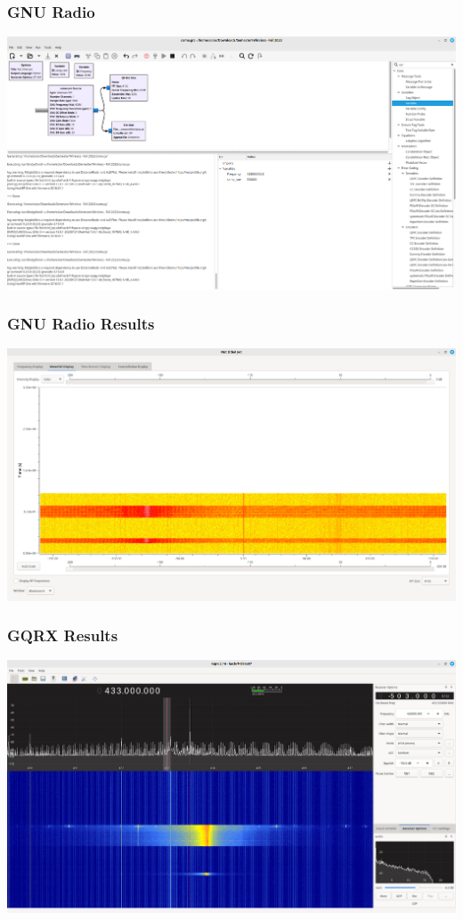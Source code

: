 \documentclass{beamer}
\begin{document}
\begin{frame}
\frametitle{GNU Radio}
  \includegraphics[width=\textwidth]{../Pics/screenshots/gnu_radio.png}
\end{frame}

\begin{frame}
\frametitle{GNU Radio Results}
  \includegraphics[width=\textwidth]{../Pics/screenshots/gnu_radio_results.png}
\end{frame}

\begin{frame}
\frametitle{GQRX Results}
  \includegraphics[width=\textwidth]{../Pics/screenshots/gqrx-results.png}
\end{frame}
\end{document}

